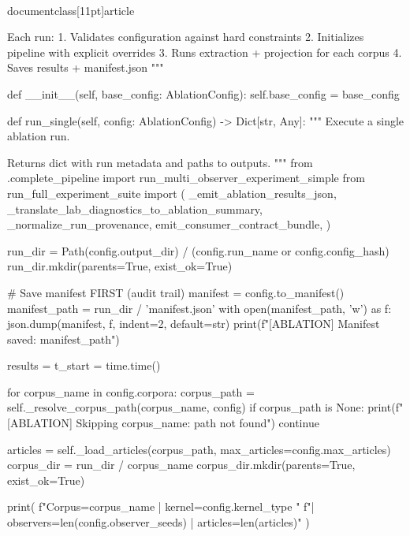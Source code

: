 \\documentclass[11pt]{article}
\begin{document}
\begin{CodeBlock}
    Each run:
    1. Validates configuration against hard constraints
    2. Initializes pipeline with explicit overrides
    3. Runs extraction + projection for each corpus
    4. Saves results + manifest.json
    """

    def __init__(self, base_config: AblationConfig):
        self.base_config = base_config

    def run_single(self, config: AblationConfig) -> Dict[str, Any]:
        """
        Execute a single ablation run.

        Returns dict with run metadata and paths to outputs.
        """
        from .complete_pipeline import run_multi_observer_experiment_simple
        from run_full_experiment_suite import (
            _emit_ablation_results_json,
            _translate_lab_diagnostics_to_ablation_summary,
            _normalize_run_provenance,
            emit_consumer_contract_bundle,
        )

        run_dir = Path(config.output_dir) / (config.run_name or config.config_hash)
        run_dir.mkdir(parents=True, exist_ok=True)

        # Save manifest FIRST (audit trail)
        manifest = config.to_manifest()
        manifest_path = run_dir / 'manifest.json'
        with open(manifest_path, 'w') as f:
            json.dump(manifest, f, indent=2, default=str)
        print(f"[ABLATION] Manifest saved: {manifest_path}")

        results = {}
        t_start = time.time()

        for corpus_name in config.corpora:
            corpus_path = self._resolve_corpus_path(corpus_name, config)
            if corpus_path is None:
                print(f"[ABLATION] Skipping {corpus_name}: path not found")
                continue

            articles = self._load_articles(corpus_path, max_articles=config.max_articles)
            corpus_dir = run_dir / corpus_name
            corpus_dir.mkdir(parents=True, exist_ok=True)

            print(
                f"\n[ABLATION] Corpus={corpus_name} | kernel={config.kernel_type} "
                f"| observers={len(config.observer_seeds)} | articles={len(articles)}"
            )


\end{CodeBlock}
\end{document}
